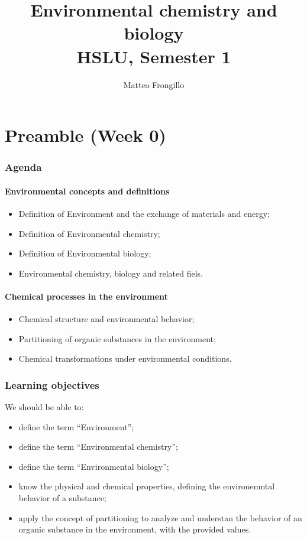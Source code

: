 \documentclass{article}
\title{\textbf{Environmental chemistry and biology \\ HSLU, Semester 1}}
\author{Matteo Frongillo}
\begin{document}
\maketitle
\tableofcontents
\pagebreak

\part*{Preamble (Week 0)}
\section{Agenda}
\subsection{Environmental concepts and definitions}
\begin{itemize}
    \item Definition of Environment and the exchange of materials and energy;
    \item Definition of Environmental chemistry;
    \item Definition of Environmental biology;
    \item Environmental chemistry, biology and related fiels.
\end{itemize}

\subsection{Chemical processes in the environment}
\begin{itemize}
    \item Chemical structure and environmental behavior;
    \item Partitioning of organic substances in the environment;
    \item Chemical transformations under environmental conditions.
\end{itemize}

\section{Learning objectives}
We should be able to:
\begin{itemize}
    \item define the term ``Environment'';
    \item define the term ``Environmental chemistry'';
    \item define the term ``Environmental biology'';
    \item know the physical and chemical properties,
        defining the environemntal behavior of a substance;
    \item apply the concept of partitioning to analyze and understan
        the behavior of an organic substance in the environment, with
        the provided values.
\end{itemize}
\end{document}
